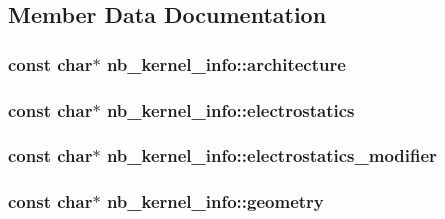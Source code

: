 \subsection{\-Member \-Data \-Documentation}
\hypertarget{structnb__kernel__info_a4bf401e06ce13a5a8ae38770a3411747}{
\subsubsection[{architecture}]{\setlength{\rightskip}{0pt plus 5cm}const char$\ast$ {\bf nb\-\_\-kernel\-\_\-info\-::architecture}}}\label{structnb__kernel__info_a4bf401e06ce13a5a8ae38770a3411747}
\hypertarget{structnb__kernel__info_aa30978e39ce295d95f05ed55e6f902ed}{
\subsubsection[{electrostatics}]{\setlength{\rightskip}{0pt plus 5cm}const char$\ast$ {\bf nb\-\_\-kernel\-\_\-info\-::electrostatics}}}\label{structnb__kernel__info_aa30978e39ce295d95f05ed55e6f902ed}
\hypertarget{structnb__kernel__info_a7f8f01ec80b45056f06c4b9933ee0880}{
\subsubsection[{electrostatics\-\_\-modifier}]{\setlength{\rightskip}{0pt plus 5cm}const char$\ast$ {\bf nb\-\_\-kernel\-\_\-info\-::electrostatics\-\_\-modifier}}}\label{structnb__kernel__info_a7f8f01ec80b45056f06c4b9933ee0880}
\hypertarget{structnb__kernel__info_a36a5baae920f0f2639b49d542d92d2ac}{
\subsubsection[{geometry}]{\setlength{\rightskip}{0pt plus 5cm}const char$\ast$ {\bf nb\-\_\-kernel\-\_\-info\-::geometry}}}\label{structnb__kernel__info_a36a5baae920f0f2639b49d542d92d2ac}
